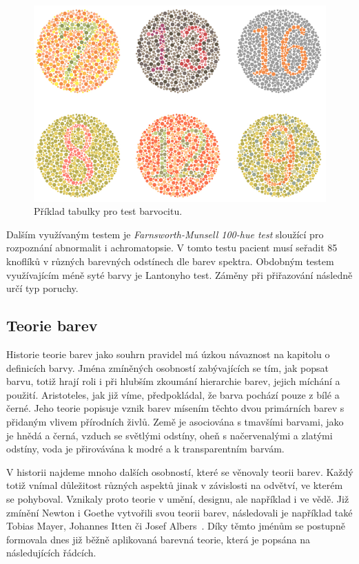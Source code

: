 \begin{figure}[!ht]
    \centering
    \includegraphics[width=0.8\linewidth]{images/vysetreni-barvocitu.png}
    \caption{Příklad tabulky pro test barvocitu.~\cite{CampaignMonitor}}
    \label{fig:Test barvocitu}
\end{figure}

Dalším využívaným testem je \emph{Farnsworth-Munsell 100-hue test} sloužící pro rozpoznání abnormalit i achromatopsie. V tomto testu pacient musí seřadit 85 knoflíků v různých
barevných odstínech dle barev spektra. Obdobným testem využívajícím méně syté barvy je Lantonyho test. Záměny při přiřazování následně určí typ poruchy.

\subsection{Teorie barev}
Historie teorie barev jako souhrn pravidel má úzkou návaznost na kapitolu o definicích barvy. Jména zmíněných osobností zabývajících se tím, jak popsat barvu, totiž hrají roli i při
hlubším zkoumání hierarchie barev, jejich míchání a použití. Aristoteles, jak již víme, předpokládal, že barva pochází pouze z bílé a černé. Jeho teorie popisuje vznik barev mísením těchto 
dvou primárních barev s přidaným vlivem přírodních živlů. Země je asociována s tmavšími barvami, jako je hnědá a černá, vzduch se světlými odstíny, oheň s načervenalými a zlatými odstíny, voda je
přirovávána k modré a k transparentním barvám.

V historii najdeme mnoho dalších osobností, které se věnovaly teorii barev. Každý totiž vnímal důležitost různých aspektů jinak v závislosti na odvětví, ve kterém se pohyboval. Vznikaly
proto teorie v umění, designu, ale například i ve vědě. Již zmínění Newton i Goethe vytvořili svou teorii barev, následovali je například také Tobias Mayer, Johannes Itten či Josef Albers~\cite{late-modernism-c-1955}.
Díky těmto jménům se postupně formovala dnes již běžně aplikovaná barevná teorie, která je popsána na následujících řádcích. 

